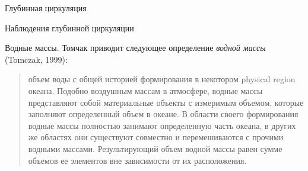 \begin{chapter}{Глубинная циркуляция}
\begin{section}{Наблюдения глубинной циркуляции}
\begin{paragraph}{Водные массы.}
Томчак приводит следующее определение 
\emph{водной массы} (Tomczak, 1999):
\begin{quote}
объем воды с общей историей формирования в некотором physical region океана.
Подобно воздушным массам в атмосфере, водные массы представляют собой 
материальные объекты с измеримым объемом, которые заполняют определенный объем
в океане. В области своего формирования водные массы полностью занимают
определенную часть океана, в других же областях они существуют совместно
и перемешиваются с прочими водными массами. Результирующий объем водной массы
равен сумме объемов ее элементов вне зависимости от их расположения.
\end{quote}
%


\end{paragraph}
\end{section}
\end{chapter}

